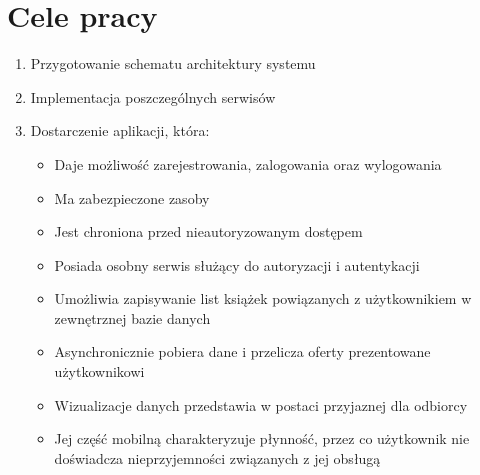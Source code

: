 
\section{Cele pracy}
\label{sec:celePracy}
\begin{enumerate}
    \item Przygotowanie schematu architektury systemu
    \item Implementacja poszczególnych serwisów
    \item Dostarczenie aplikacji, która: 
    \begin{itemize}
        \item Daje możliwość zarejestrowania, zalogowania oraz wylogowania
        \item Ma zabezpieczone zasoby
        \item Jest chroniona przed nieautoryzowanym dostępem
        \item Posiada osobny serwis służący do autoryzacji i autentykacji
        \item Umożliwia zapisywanie list książek powiązanych z użytkownikiem w zewnętrznej bazie danych 
        \item Asynchronicznie pobiera dane i przelicza oferty prezentowane użytkownikowi
        \item Wizualizacje danych przedstawia w postaci przyjaznej dla odbiorcy
        \item Jej część mobilną charakteryzuje płynność, przez co użytkownik nie doświadcza nieprzyjemności związanych z jej obsługą
    \end{itemize}
\end{enumerate}
\newpage
